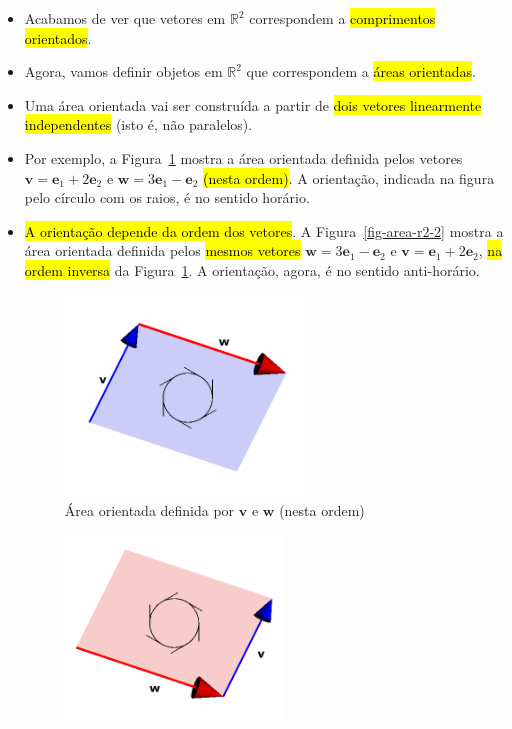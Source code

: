 \documentclass[
  letterpaper,
  DIV=11,
  numbers=noendperiod]{scrreprt}
\begin{document}
\begin{itemize}
\item
  Acabamos de ver que vetores em $\mathbb{R}^2$ correspondem a
  {\hl{comprimentos orientados}}.
\item
  Agora, vamos definir objetos em $\mathbb{R}^2$ que correspondem a
  {\hl{áreas orientadas}}.
\item
  Uma área orientada vai ser construída a partir de {\hl{dois vetores
  linearmente independentes}} (isto é, não paralelos).
\item
  Por exemplo, a Figura~\ref{fig-area-r2} mostra a área orientada
  definida pelos vetores $\mathbf{v} = \mathbf{e}_{1} + 2\mathbf{e}_{2}$
  e $\mathbf{w} = 3\mathbf{e}_{1} - \mathbf{e}_{2}$ {\hl{(nesta
  ordem)}}. A orientação, indicada na figura pelo círculo com os raios,
  é no sentido horário.
\item
  {\hl{A orientação depende da ordem dos vetores}}. A
  Figura~\ref{fig-area-r2-2} mostra a área orientada definida pelos
  {\hl{mesmos vetores}} $\mathbf{w} = 3\mathbf{e}_{1} - \mathbf{e}_{2}$
  e $\mathbf{v} = \mathbf{e}_{1} + 2\mathbf{e}_{2}$, {\hl{na ordem
  inversa}} da Figura~\ref{fig-area-r2}. A orientação, agora, é no
  sentido anti-horário.

  \begin{figure}[htb]

  {\centering \includegraphics[width=0.6\textwidth,height=\textheight]{figures/fig-area-r2.png}

  }

  \caption{\label{fig-area-r2}Área orientada definida por $\mathbf{v}$ e
  $\mathbf{w}$ (nesta ordem)}

  \end{figure}

  \begin{figure}[htb]

  {\centering \includegraphics[width=0.55\textwidth,height=\textheight]{figures/fig-area-r2-2.png}

}
\end{figure}
\end{itemize}
\end{document}
